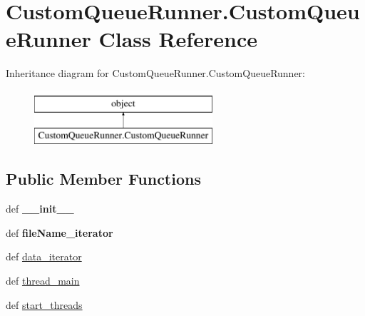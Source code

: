 \hypertarget{classCustomQueueRunner_1_1CustomQueueRunner}{\section{Custom\-Queue\-Runner.\-Custom\-Queue\-Runner Class Reference}
\label{classCustomQueueRunner_1_1CustomQueueRunner}
}
Inheritance diagram for Custom\-Queue\-Runner.\-Custom\-Queue\-Runner\-:\begin{figure}[H]
\begin{center}
\leavevmode
\includegraphics[height=2.000000cm]{classCustomQueueRunner_1_1CustomQueueRunner}
\end{center}
\end{figure}
\subsection*{Public Member Functions}
\begin{DoxyCompactItemize}
\item 
\hypertarget{classCustomQueueRunner_1_1CustomQueueRunner_af76d3fec912865bf7d94701af4e7c068}{def {\bfseries \-\_\-\-\_\-init\-\_\-\-\_\-}}\label{classCustomQueueRunner_1_1CustomQueueRunner_af76d3fec912865bf7d94701af4e7c068}

\item 
\hypertarget{classCustomQueueRunner_1_1CustomQueueRunner_a53f6b52ead2366c4c9982f7b0f76a8c9}{def {\bfseries file\-Name\-\_\-iterator}}\label{classCustomQueueRunner_1_1CustomQueueRunner_a53f6b52ead2366c4c9982f7b0f76a8c9}

\item 
def \hyperlink{classCustomQueueRunner_1_1CustomQueueRunner_aa15d0ce6375f74387b8b85f28356bd8c}{data\-\_\-iterator}
\item 
def \hyperlink{classCustomQueueRunner_1_1CustomQueueRunner_a9146cfaf42a1bcd9b5511fb99a2c7115}{thread\-\_\-main}
\item 
def \hyperlink{classCustomQueueRunner_1_1CustomQueueRunner_ad43f2e2230cba3ee0e1162eafc763ccd}{start\-\_\-threads}
\end{DoxyCompactItemize}
